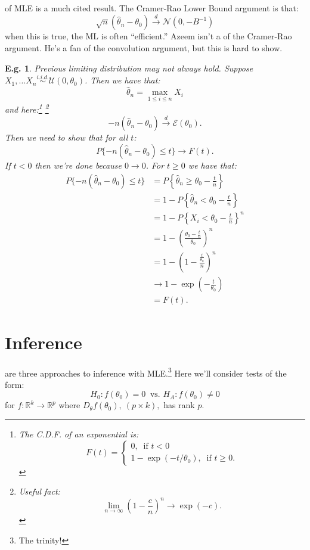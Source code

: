 \documentclass{tufte-book}
\theoremstyle{mytheoremstyle}
\theoremstyle{mylemstyle}
\theoremstyle{mydefstyle}
\newtheorem*{ex}{E.g.}
\begin{document}
 of MLE is a much cited result. The Cramer-Rao Lower Bound argument is that:
	\[\sqrt{n}(\hat{\theta}_n - \theta_0) \overset{d}{\rightarrow} \mathcal{N}(0, -B^{-1})\]
when this is true, the ML is often ``efficient.'' Azeem isn't a of the Cramer-Rao argument. He's a fan of the convolution argument, but this is hard to show. 
\begin{ex} Previous limiting distribution may not always hold. Suppose \(X_1, \dots X_n \overset{i.i.d.}{\sim} \mathcal{U}(0, \theta_0)\). Then we have that:
	\[\hat{\theta}_n = \max_{1 \le i \le n} X_i\]
and here:\footnote{The C.D.F. of an exponential is:
	\[F(t) = \begin{cases} 0,\ \text{ if } t < 0 \\ 1-\exp(-t/\theta_0),\ \text{ if } t \ge 0 \text{.} \end{cases} \]}
\footnote{\emph{Useful fact:}
	\[\lim_{n \rightarrow \infty} \left(1 - \frac{c}{n}\right)^n \rightarrow \exp(-c) \text{.}\]}
	\[-n (\hat{\theta}_n - \theta_0) \overset{d}{\rightarrow} \mathcal{E}(\theta_0) \text{.}\]
Then we need to show that for all \(t\):
	\[P\{-n(\hat{\theta}_n - \theta_0) \le t \} \rightarrow F(t) \text{.}\]
If \(t < 0\) then we're done because \(0 \rightarrow 0\). For \(t \ge 0\) we have that:
	\begin{align*}
		P\{-n(\hat{\theta}_n - \theta_0) \le t\} &= P\left\{\hat{\theta}_n \ge \theta_0 - \frac{t}{n}\right\} \\
									&= 1 - P\left\{\hat{\theta}_n < \theta_0 - \frac{t}{n} \right\} \\
									&= 1 - P\left\{X_i < \theta_0 - \frac{t}{n} \right\}^n \\
									&= 1 - \left(\frac{\theta_0 - \frac{t}{n}}{\theta_0}\right)^n \\
									&= 1 - \left(1 - \frac{\frac{t}{\theta_0}}{n}\right)^n \\
									& \rightarrow 1 - \exp\left(-\frac{t}{\theta_0}\right) \\
									&= F(t) \text{.}
 	\end{align*}
\end{ex}

\section{Inference}
 are three approaches to inference with MLE.\footnote{The trinity!} Here we'll consider tests of the form: 
	\[H_0: f(\theta_0) = 0\ \text{ vs. } H_A: f(\theta_0) \ne 0\]
for \(f: \mathbb{R}^k \rightarrow \mathbb{R}^p\) where \(D_\theta f(\theta_0),\ (p \times k),\) has rank \(p\). 
\end{document}
